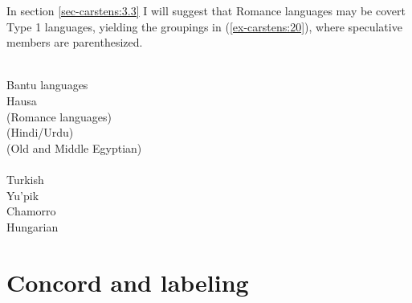 \documentclass[output=paper
,modfonts
,nonflat]{langsci/langscibook}
\begin{document}
\begin{figure}[!h]
	\begin{exe}
	\end{exe} \vspace{-0.8cm}
\end{figure}
\noindent In section \ref{sec-carstens:3.3} I will suggest that Romance languages may be covert Type 1 languages, yielding the groupings in (\ref{ex-carstens:20}), where speculative members are parenthesized.
\begin{exe}
	\ex \label{ex-carstens:20}
	\begin{multicols}{2} \raggedcolumns
{}  \\
Bantu languages  \\
Hausa  \\
(Romance languages)  \\
(Hindi/Urdu)  \\
(Old and Middle Egyptian)   
\columnbreak \\
   \\
Turkish\\
Yu'pik\\
Chamorro\\
Hungarian
\end{multicols}
\end{exe}

\section{Concord and labeling} \label{sec-carstens:3}
\end{document}
